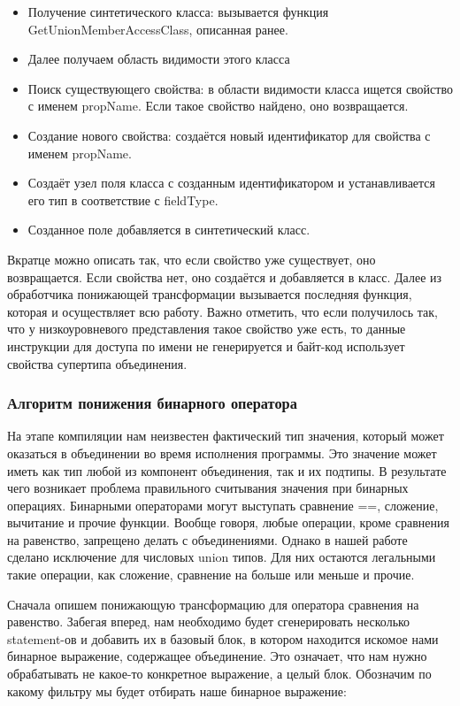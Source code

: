 \begin{itemize}[left=2em]
    \item Получение синтетического класса: вызывается функция GetUnionMemberAccessClass, описанная ранее.
    \item Далее получаем область видимости этого класса
    \item Поиск существующего свойства: в области видимости класса ищется свойство с именем propName.
    Если такое свойство найдено, оно возвращается.
    \item Создание нового свойства: создаётся новый идентификатор для свойства с именем propName.
    \item Создаёт узел поля класса с созданным идентификатором и устанавливается его тип в соответствие с fieldType.
    \item Созданное поле добавляется в синтетический класс.
\end{itemize}

Вкратце можно описать так, что если свойство уже существует, оно возвращается.
Если свойства нет, оно создаётся и добавляется в класс.
Далее из обработчика понижающей трансформации вызывается последняя функция, которая и осуществляет всю работу.
Важно отметить, что если получилось так, что у низкоуровневого представления такое свойство уже есть, то данные
инструкции для доступа по имени не генерируется и байт-код использует свойства супертипа объединения.

\subsubsection{Алгоритм понижения бинарного оператора}

На этапе компиляции нам неизвестен фактический тип значения, который может оказаться в объединении во время исполнения
программы.
Это значение может иметь как тип любой из компонент объединения, так и их подтипы.
В результате чего возникает проблема правильного считывания значения при бинарных операциях.
Бинарными операторами могут выступать сравнение ==, сложение, вычитание и прочие функции.
Вообще говоря, любые операции, кроме сравнения на равенство, запрещено делать с объединениями.
Однако в нашей работе сделано исключение для числовых union типов.
Для них остаются легальными такие операции, как сложение, сравнение на больше или меньше и прочие.

Сначала опишем понижающую трансформацию для оператора сравнения на равенство.
Забегая вперед, нам необходимо будет сгенерировать несколько statement-ов и добавить их в базовый блок, в котором находится
искомое нами бинарное выражение, содержащее объединение.
Это означает, что нам нужно обрабатывать не какое-то конкретное выражение, а целый блок.
Обозначим по какому фильтру мы будет отбирать наше бинарное выражение:

